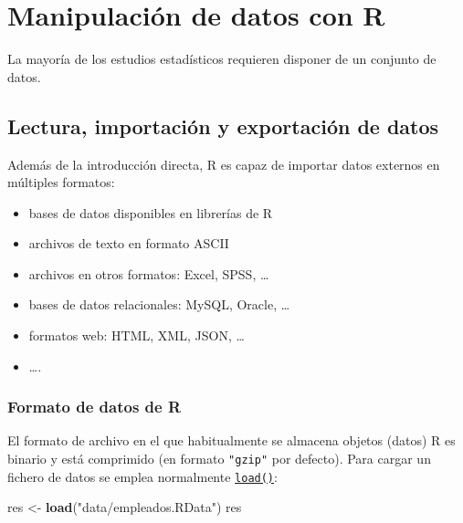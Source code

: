 \documentclass[]{book}
\newenvironment{Shaded}{\begin{snugshade}}{\end{snugshade}}
\newcommand{\KeywordTok}[1]{\textcolor[rgb]{0.13,0.29,0.53}{\textbf{#1}}}
\newcommand{\NormalTok}[1]{#1}
\newcommand{\StringTok}[1]{\textcolor[rgb]{0.31,0.60,0.02}{#1}}
\begin{document}
\hypertarget{manipulacion-de-datos-con-r}{%
\chapter{Manipulación de datos con R}\label{manipulacion-de-datos-con-r}}

La mayoría de los estudios estadísticos
requieren disponer de un conjunto de datos.

\hypertarget{lectura-importacion-y-exportacion-de-datos}{%
\section{Lectura, importación y exportación de datos}\label{lectura-importacion-y-exportacion-de-datos}}

Además de la introducción directa, R es capaz de
importar datos externos en múltiples formatos:

\begin{itemize}
\item
  bases de datos disponibles en librerías de R
\item
  archivos de texto en formato ASCII
\item
  archivos en otros formatos: Excel, SPSS, \ldots{}
\item
  bases de datos relacionales: MySQL, Oracle, \ldots{}
\item
  formatos web: HTML, XML, JSON, \ldots{}
\item
  \ldots{}.
\end{itemize}

\hypertarget{formato-de-datos-de-r}{%
\subsection{Formato de datos de R}\label{formato-de-datos-de-r}}

El formato de archivo en el que habitualmente se almacena objetos (datos)
R es binario y está comprimido (en formato \texttt{"gzip"} por defecto).
Para cargar un fichero de datos se emplea normalmente \href{https://www.rdocumentation.org/packages/base/versions/3.6.1/topics/load}{\texttt{load()}}:

\begin{Shaded}
\begin{Highlighting}[]
\NormalTok{res <-}\StringTok{ }\KeywordTok{load}\NormalTok{(}\StringTok{"data/empleados.RData"}\NormalTok{)}
\NormalTok{res}
\end{Highlighting}
\end{Shaded}
\end{document}

